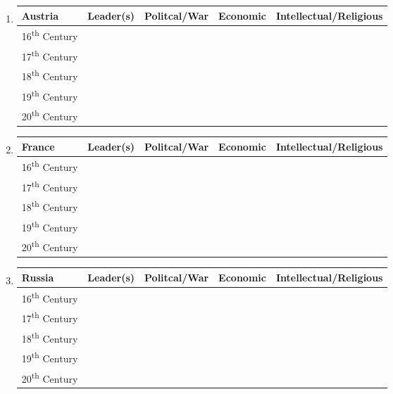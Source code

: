 \documentclass[12pt]{article}
\begin{document}
\begin{enumerate}
\begin{tabular}{l c c c c}
\end{tabular}

\item \begin{tabular}{l c c c c}

Austria & Leader(s) & Politcal/War & Economic & Intellectual/Religious \\
\hline
16\textsuperscript{th} Century & & & & \\
\hline
17\textsuperscript{th} Century & & & & \\
\hline
18\textsuperscript{th} Century & & & & \\
\hline
19\textsuperscript{th} Century & & & & \\
\hline
20\textsuperscript{th} Century & & & & \\

\end{tabular}

\item \begin{tabular}{l c c c c}

France & Leader(s) & Politcal/War & Economic & Intellectual/Religious \\
\hline
16\textsuperscript{th} Century & & & & \\
\hline
17\textsuperscript{th} Century & & & & \\
\hline
18\textsuperscript{th} Century & & & & \\
\hline
19\textsuperscript{th} Century & & & & \\
\hline
20\textsuperscript{th} Century & & & & \\

\end{tabular}

\item \begin{tabular}{l c c c c}

Russia & Leader(s) & Politcal/War & Economic & Intellectual/Religious \\
\hline
16\textsuperscript{th} Century & & & & \\
\hline
17\textsuperscript{th} Century & & & & \\
\hline
18\textsuperscript{th} Century & & & & \\
\hline
19\textsuperscript{th} Century & & & & \\
\hline
20\textsuperscript{th} Century & & & & \\

\end{tabular}


\end{enumerate}
\end{document}
